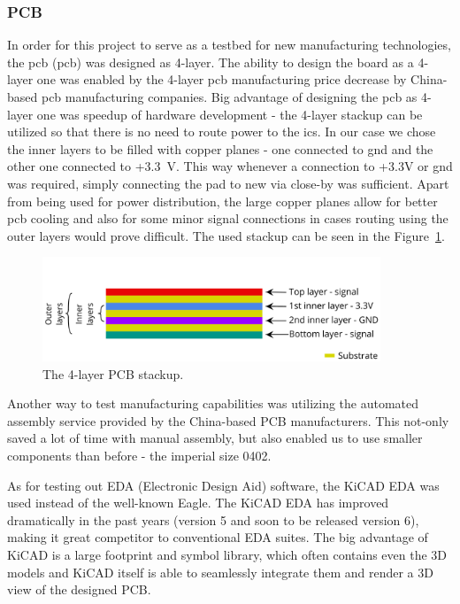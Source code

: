 \subsubsection{PCB}
\label{subsubsec:pcb_design}
In order for this project to serve as a testbed for new manufacturing technologies, the \acs{pcb} (\acl{pcb}) was designed as 4-layer.
The ability to design the board as a 4-layer one was enabled by the 4-layer \acs{pcb} manufacturing price decrease by China-based \acs{pcb} manufacturing companies.
Big advantage of designing the \acs{pcb} as 4-layer one was speedup of hardware development - the 4-layer stackup can be utilized so that there is no need to route power to the \acs{ic}s.
In our case we chose the inner layers to be filled with copper planes - one connected to \acs{gnd} and the other one connected to +3.3~V.
This way whenever a connection to +3.3V or \acs{gnd} was required, simply connecting the pad to new via close-by was sufficient.
Apart from being used for power distribution, the large copper planes allow for better \acs{pcb} cooling and also for some minor signal connections in cases routing using the outer layers would prove difficult.
The used stackup can be seen in the Figure~\ref{fig:stackup}.

\begin{figure}[H]
    \centering
    \includegraphics[width=0.9\textwidth]{obrazky/stackup}
    \caption{The 4-layer PCB stackup.}
    \label{fig:stackup}
\end{figure}

Another way to test manufacturing capabilities was utilizing the automated assembly service provided by the China-based PCB manufacturers.
This not-only saved a lot of time with manual assembly, but also enabled us to use smaller components than before - the imperial size 0402.

As for testing out EDA (Electronic Design Aid) software, the KiCAD EDA was used instead of the well-known Eagle.
The KiCAD EDA has improved dramatically in the past years (version 5 and soon to be released version 6), making it great competitor to conventional EDA suites.
The big advantage of KiCAD is a large footprint and symbol library, which often contains even the 3D models and KiCAD itself is able to seamlessly integrate them and render a 3D view of the designed PCB.
